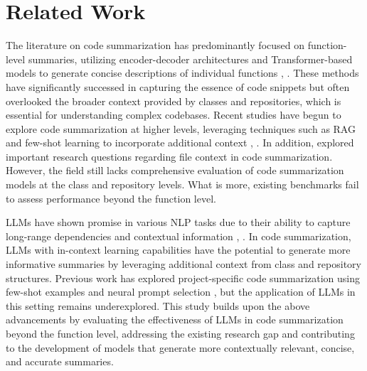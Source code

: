 \section{Related Work}
\vspace*{-1mm}

The literature on code summarization has predominantly focused on function-level summaries, utilizing encoder-decoder architectures and Transformer-based models to generate concise descriptions of individual functions \cite{vaswani2017attention}, \cite{CodeT5}. These methods have significantly successed in capturing the essence of code snippets but often overlooked the broader context provided by classes and repositories, which is essential for understanding complex codebases. Recent studies have begun to explore code summarization at higher levels, leveraging techniques such as RAG and few-shot learning to incorporate additional context \cite{StarCoder}, \cite{liu2023repobench}. In addition, \cite{su2024revisiting} explored important research questions regarding file context in code summarization. However, the field still lacks comprehensive evaluation of code summarization models at the class and repository levels. What is more, existing benchmarks fail to assess performance beyond the function level.

LLMs have shown promise in various NLP tasks due to their ability to capture long-range dependencies and contextual information \cite{GPT-4}, \cite{DeepSeekCoder}. In code summarization, LLMs with in-context learning capabilities have the potential to generate more informative summaries by leveraging additional context from class and repository structures. Previous work has explored project-specific code summarization using few-shot examples and neural prompt selection \cite{PSCodeSum}, but the application of LLMs in this setting remains underexplored. This study builds upon the above advancements by evaluating the effectiveness of LLMs in code summarization beyond the function level, addressing the existing research gap and contributing to the development of models that generate more contextually relevant, concise, and accurate summaries.

\vspace*{-1mm}